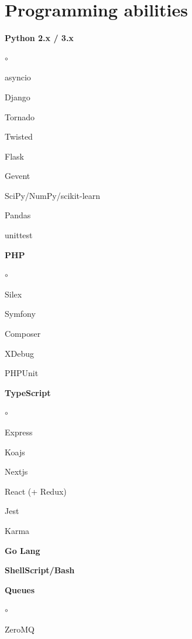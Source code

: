 \documentclass{cv}
\begin{document}
\section* {Programming abilities}
  \begin{multicols}{3}
    \begin {list}{\textbullet}{\itemsep=0mm}
      \item \textbf{Python 2.x / 3.x}
        \begin {list}{$\circ$}{}
          \item asyncio
          \item Django
          \item Tornado
          \item Twisted
          \item Flask
          \item Gevent
          \item SciPy/NumPy/scikit-learn
          \item Pandas
          \item unittest
        \end{list}
      \item \textbf{PHP}
        \begin {list}{$\circ$}{}
          \item Silex
          \item Symfony
          \item Composer
          \item XDebug
          \item PHPUnit
        \end{list}
      \item \textbf{TypeScript}
        \begin {list}{$\circ$}{}
          \item Express
          \item Koajs
          \item Nextjs
          \item React (+ Redux)
          \item Jest
          \item Karma
        \end{list}
      \columnbreak
      \item \textbf{Go Lang}
      \item \textbf{ShellScript/Bash}
      \item \textbf{Queues}
        \begin {list}{$\circ$}{}
          \item ZeroMQ

\end{list}
\end{list}
\end{multicols}
\end{document}
